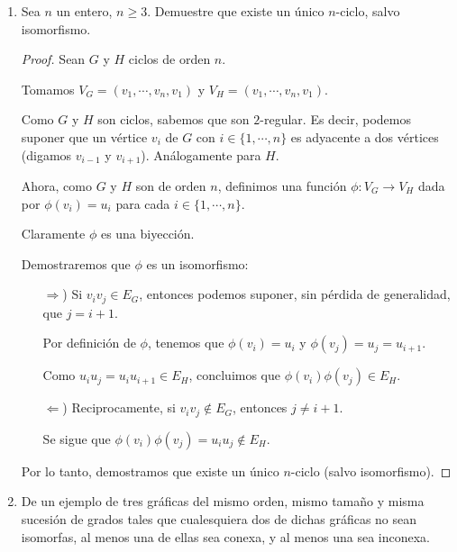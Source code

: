 \documentclass{article}
\begin{document}
\begin{enumerate}
\item Sea $n$ un entero, $n \ge 3$.   Demuestre que existe un \'unico
  $n$-ciclo, salvo isomorfismo.
  \renewcommand\qedsymbol{QED}
  \begin{proof}
    Sean $G$ y $H$ ciclos de orden $n$.

    Tomamos $V_{G} = (v_{1}, \dotsm, v_{n}, v_{1})$ y
    $V_{H} = (v_{1}, \dotsm, v_{n}, v_{1})$.
    
    Como $G$ y $H$ son ciclos, sabemos que son $2$-regular.
    Es decir, podemos suponer que un vértice $v_{i}$ de $G$
    con $i \in  \{1, \dotsm, n\}$ es adyacente a dos vértices
    (digamos $v_{i - 1}$ y $v_{i + 1}$). Análogamente para $H$.
    
    Ahora, como $G$ y $H$ son de orden $n$, definimos una
    función $\phi: V_{G} \rightarrow V_{H}$ dada por
    $\phi(v_{i}) = u_{i}$ para cada $i \in  \{1, \dotsm, n\}$.

    Claramente $\phi$ es una biyección.

    Demostraremos que $\phi$ es un isomorfismo:
    \begin{itemize} %
    \item[$\Rightarrow$)] Si $v_{i} v_{j} \in E_{G}$, entonces
      podemos suponer, sin pérdida de generalidad, que $j = i + 1$.

      Por definición de $\phi$, tenemos que $\phi(v_{i}) = u_{i}$
      y $\phi(v_{j}) = u_{j} = u_{i + 1}$.

      Como $u_{i}u_{j} = u_{i}u_{i + 1} \in E_{H}$, concluimos que
      $\phi(v_{i})\phi(v_{j}) \in E_{H}$.
    \item[$\Leftarrow$)] Reciprocamente, si $v_{i} v_{j} \notin E_{G}$,
      entonces $j \neq i+1$.
      
      Se sigue que $\phi (v_{i}) \phi (v_{j}) = u_{i} u_{j} \notin E_{H}$.
    \end{itemize}
    
    Por lo tanto, demostramos que existe un único $n$-ciclo
    (salvo isomorfismo).
  \end{proof}
\item De un ejemplo de tres gr\'aficas del mismo orden, mismo tama\~no y misma
  sucesi\'on de grados tales que cualesquiera dos de dichas gr\'aficas no sean
  isomorfas, al menos una de ellas sea conexa, y al menos una sea inconexa.
  

\end{enumerate}
\end{document}
